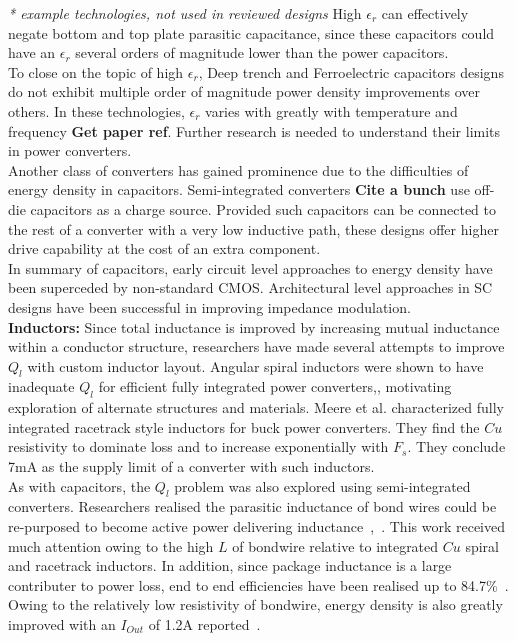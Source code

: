\documentclass[letterpaper,twocolumn,10pt]{article}
\begin{document}
\textit{* example technologies, not used in reviewed designs}
High $\epsilon_r$ can effectively negate bottom and top plate parasitic capacitance, since these capacitors could have an $\epsilon_r$ several orders of magnitude lower than the power capacitors.\\ 
To close on the topic of high $\epsilon_r$, Deep trench and Ferroelectric capacitors designs do not exhibit multiple order of magnitude power density improvements over others. In these technologies, $\epsilon_r$ varies with greatly with temperature \cite{Lee2004} and frequency \textbf{Get paper ref}. %
Further research is needed to understand their limits in power converters.\\
Another class of converters has gained prominence due to the difficulties of energy density in capacitors. Semi-integrated converters \textbf{Cite a bunch} use off-die capacitors as a charge source. Provided such capacitors can be connected to the rest of a converter with a very low inductive path, these designs offer higher drive capability at the cost of an extra component.\\
\indent In summary of capacitors, early circuit level approaches to energy density have been superceded by non-standard CMOS. Architectural level approaches in SC designs have been successful in improving impedance modulation.\\
\textbf{Inductors: }Since total inductance is improved by increasing mutual inductance within a conductor structure, researchers have made several attempts to improve $Q_l$ with custom inductor layout. Angular spiral inductors were shown to have inadequate $Q_l$ for efficient fully integrated power converters\cite{Alimadadi2008},\cite{Artillan2011}, motivating exploration of alternate structures and materials. Meere et al. \cite{Meere2009} characterized fully integrated racetrack style inductors for buck power converters. They find the $Cu$ resistivity to dominate loss and to increase exponentially with $F_s$. They conclude 7mA as the supply limit of a converter with such inductors.\\
As with capacitors, the $Q_l$ problem was also explored using semi-integrated converters. Researchers realised the parasitic inductance of bond wires could be re-purposed to become active power delivering inductance~\cite{Wens2007},~\cite{Ahn2012}. This work received much attention owing to the high $L$ of bondwire relative to integrated $Cu$ spiral and racetrack inductors. In addition, since package inductance is a large contributer to power loss, end to end efficiencies have been realised up to 84.7\%~\cite{Cheng2013}. Owing to the relatively low resistivity of bondwire, energy density is also greatly improved with an $I_{Out}$ of 1.2A reported~\cite{Cheng2013}.\\
\end{document}
